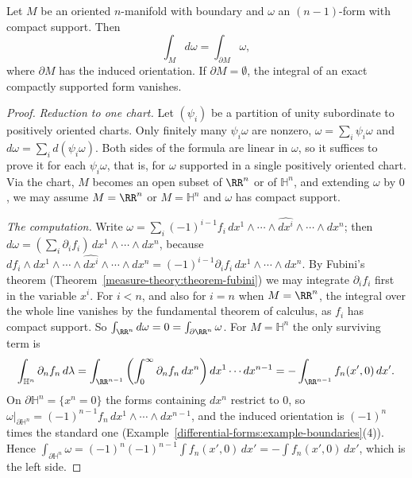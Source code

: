 \begin{theorem}[Stokes]\label{differential-forms:theorem-stokes}
Let $M$ be an oriented $n$-manifold with boundary and $\omega$ an $(n-1)$-form with compact support. Then
\[
\int_Md\omega = \int_{\partial M}\omega,
\]
where $\partial M$ has the induced orientation. If $\partial M = \emptyset$, the integral of an exact compactly supported form vanishes.
\end{theorem}

\begin{proof}
\emph{Reduction to one chart.} Let $(\psi_i)$ be a partition of unity subordinate to positively oriented charts. Only finitely many $\psi_i\omega$ are nonzero, $\omega = \sum_i\psi_i\omega$ and
$d\omega = \sum_id(\psi_i\omega)$. Both sides of the formula are linear in $\omega$, so it suffices to prove it for each $\psi_i\omega$, that is, for $\omega$ supported in a single positively oriented
chart. Via the chart, $M$ becomes an open subset of $\RR^n$ or of $\mathbb{H}^n$, and extending $\omega$ by $0$, we may assume $M = \RR^n$ or $M = \mathbb{H}^n$ and $\omega$ has compact support.

\emph{The computation.} Write
$\omega = \sum_i(-1)^{i-1}f_i\,dx^1 \wedge \cdots \wedge \widehat{dx^i} \wedge \cdots \wedge dx^n$; then $d\omega = (\sum_i\partial_if_i)\,dx^1 \wedge \cdots \wedge dx^n$, because
$d f_i \wedge dx^1 \wedge \cdots \wedge \widehat{dx^i} \wedge \cdots \wedge dx^n = (-1)^{i-1}\partial_if_i\,dx^1 \wedge \cdots \wedge dx^n$. By Fubini's theorem (Theorem~\ref{measure-theory:theorem-fubini})
we may integrate $\partial_if_i$ first in the variable $x^i$. For $i < n$, and also for $i = n$ when $M = \RR^n$, the integral over the whole line vanishes by the fundamental theorem of calculus,
as $f_i$ has compact support. So $\int_{\RR^n}d\omega = 0 = \int_{\partial\RR^n}\omega$. For $M = \mathbb{H}^n$ the only surviving term is
\[
\int_{\mathbb{H}^n}\partial_nf_n\,d\lambda = \int_{\RR^{n-1}}\left(\int_0^\infty\partial_nf_n\,dx^n\right)dx^1 \cdots dx^{n-1} = -\int_{\RR^{n-1}}f_n(x', 0)\,dx' .
\]
On $\partial\mathbb{H}^n = \{x^n = 0\}$ the forms containing $dx^n$ restrict to $0$, so $\omega|_{\partial\mathbb{H}^n} = (-1)^{n-1}f_n\,dx^1 \wedge \cdots \wedge dx^{n-1}$, and the induced orientation is
$(-1)^n$ times the standard one (Example~\ref{differential-forms:example-boundaries}(4)). Hence $\int_{\partial\mathbb{H}^n}\omega = (-1)^n(-1)^{n-1}\int f_n(x', 0)\,dx' = -\int f_n(x', 0)\,dx'$,
which is the left side.
\end{proof}

